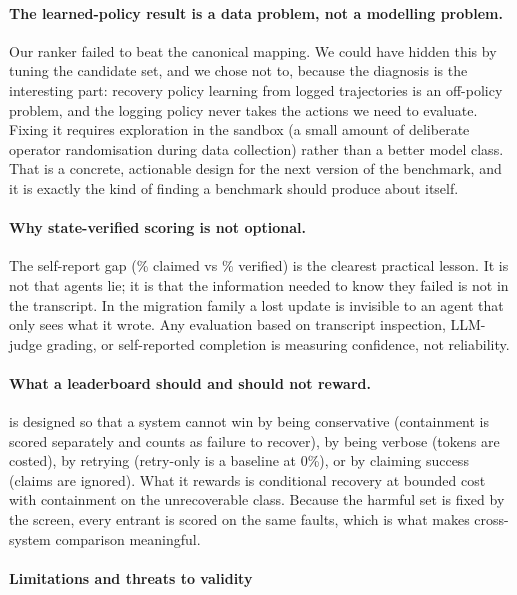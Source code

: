 \paragraph{The learned-policy result is a data problem, not a modelling problem.} Our ranker failed
to beat the canonical mapping. We could have hidden this by tuning the candidate set, and we chose
not to, because the diagnosis is the interesting part: recovery policy learning from logged
trajectories is an off-policy problem, and the logging policy never takes the actions we need to
evaluate. Fixing it requires exploration in the sandbox (a small amount of deliberate operator
randomisation during data collection) rather than a better model class. That is a concrete,
actionable design for the next version of the benchmark, and it is exactly the kind of finding a
benchmark should produce about itself.

\paragraph{Why state-verified scoring is not optional.} The self-report gap (\ClaimedPct\% claimed
vs \VerifiedPct\% verified) is the clearest practical lesson. It is not that agents lie; it is that
the information needed to know they failed is not in the transcript. In the migration family a lost
update is invisible to an agent that only sees what it wrote. Any evaluation based on transcript
inspection, LLM-judge grading, or self-reported completion is measuring confidence, not reliability.

\paragraph{What a leaderboard should and should not reward.} \arb{} is designed so that a system
cannot win by being conservative (containment is scored separately and counts as failure to
recover), by being verbose (tokens are costed), by retrying (retry-only is a baseline at 0\%), or by
claiming success (claims are ignored). What it rewards is conditional recovery at bounded cost with
containment on the unrecoverable class. Because the harmful set is fixed by the screen, every
entrant is scored on the same faults, which is what makes cross-system comparison meaningful.

\paragraph{Limitations and threats to validity}\label{sec:limits}

